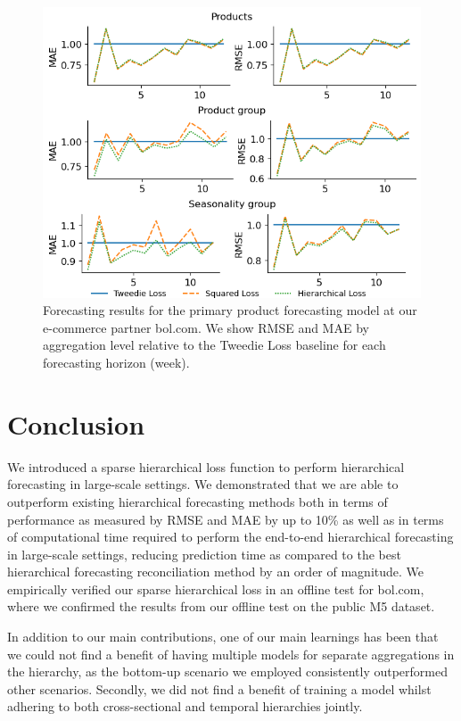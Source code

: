 \documentclass[preprint, 3p, times, twocolumn]{elsarticle}
\begin{document}
  \begin{figure}[t] 
    \includegraphics[width=\columnwidth, keepaspectratio]{assets/bol_levels.png}
    \caption{Forecasting results for the primary product forecasting model at our e-commerce partner bol.com. We show RMSE and MAE by aggregation level relative to the Tweedie Loss baseline for each forecasting horizon (week).}
    \label{fig:bol_level_results}
  \end{figure}


\section{Conclusion} \label{sec:conclusion}
  We introduced a sparse hierarchical loss function to perform hierarchical forecasting in large-scale settings. We demonstrated that we are able to outperform existing hierarchical forecasting methods both in terms of performance as measured by RMSE and MAE by up to 10\% as well as in terms of computational time required to perform the end-to-end hierarchical forecasting in large-scale settings, reducing prediction time as compared to the best hierarchical forecasting reconciliation method by an order of magnitude. We empirically verified our sparse hierarchical loss in an offline test for bol.com, where we confirmed the results from our offline test on the public M5 dataset. 

  In addition to our main contributions, one of our main learnings has been that we could not find a benefit of having multiple models for separate aggregations in the hierarchy, as the bottom-up scenario we employed consistently outperformed other scenarios. Secondly, we did not find a benefit of training a model whilst adhering to both cross-sectional and temporal hierarchies jointly. 
\end{document}
